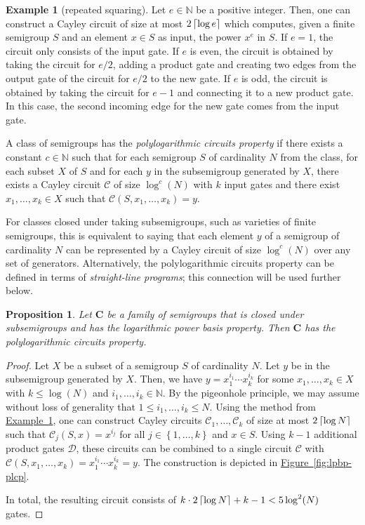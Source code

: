 \documentclass[11pt]{article}
\numberwithin{equation}{section}
\newtheorem{proposition}[theorem]{Proposition}
\theoremstyle{definition}
\newtheorem{example}[theorem]{Example}
\theoremstyle{plain}
\newcommand{\C}{\mathbb C}
\newcommand{\N}{\mathbb N}
\newcommand{\expref}[2]{\hyperref[#2]{#1~\ref{#2}}}
\renewcommand{\leq}{\leqslant}
\renewcommand{\le}{\leq}
\newcommand{\ceil}[1]{\ensuremath\left\lceil#1\right\rceil}
\newcommand{\os}[1]{\ensuremath{\left\{#1\right\}}}
\newcommand{\vC}{\mathbf{C}}
\renewcommand{\C}{\ensuremath{\mathcal{C}}}
\newcommand{\SLPBP}{logarithmic power basis property}
\newcommand{\SPLCP}{polylogarithmic circuits property}
\begin{document}
%
%
\begin{example}[repeated squaring]   %
  Let $e \in \N$ be a positive integer.
  Then, one can construct a Cayley circuit of size at most $2\ceil{\log e}$
  which computes, given a finite semigroup $S$ and an element $x \in S$ as
  input, the power $x^e$ in $S$.
  If $e = 1$, the circuit only consists of the input gate.
  If $e$ is even, the circuit is obtained by taking the circuit for $e/2$,
  adding a product gate and creating two edges from the output gate of the
  circuit for $e/2$ to the new gate.
  If $e$ is odd, the circuit is obtained by taking the circuit for $e-1$ and
  connecting it to a new product gate. In this case, the second incoming edge
  for the new gate comes from the input gate.
  \label{ex:power}
\end{example}

%
A class of semigroups has the \emph{\SPLCP} if there exists a constant $c \in
\N$ such that for each semigroup $S$ of cardinality $N$ from the class, for
each subset $X$ of $S$ and for each $y$ in the subsemigroup generated by $X$,
there exists a Cayley circuit $\C$ of size $\log^c(N)$ with $k$ input gates and
there exist $x_1, \dots, x_k \in X$ such that $\C(S, x_1, \dots, x_k) = y$.

For classes closed under taking subsemigroups, such as varieties of finite
semigroups, this is equivalent to saying that each element $y$ of a semigroup
of cardinality $N$ can be represented by a Cayley circuit of size $\log^c(N)$
over any set of generators.
%
Alternatively, the {\SPLCP} can be defined in terms of \emph{straight-line
programs}; this connection will be used further below.

\begin{proposition}
  Let $\vC$ be a family of semigroups that is closed under subsemigroups and
  has the {\SLPBP}. Then $\vC$ has the {\SPLCP}.
  \label{prop:lpbp-plcp}
\end{proposition}
%
\begin{proof}
  Let $X$ be a subset of a semigroup $S$ of cardinality $N$. Let $y$ be in the
  subsemigroup generated by $X$.
  Then, we have $y = x_1^{i_1} \cdots x_k^{i_k}$ for some $x_1, \dots, x_k \in
  X$  with $k \le \log(N)$ and $i_1, \dots, i_k \in \N$.
  By the pigeonhole principle, we may assume without loss of generality that
  $1 \le i_1, \dots, i_k \le N$.
  Using the method from \expref{Example}{ex:power}, one can construct Cayley
  circuits $\C_1, \dots, \C_k$ of size at most $2\ceil{\log N}$ such that
  $\C_j(S, x) = x^{i_j}$ for all $j \in \os{1, \dots, k}$ and $x \in S$. Using
  $k-1$ additional product gates $\mathcal{D}$, these circuits can be combined
  to a single circuit $\C$ with $\C(S, x_1, \dots, x_k) = x_1^{i_1} \cdots
  x_k^{i_k} = y$.
  The construction is depicted in \expref{Figure}{fig:lpbp-plcp}.

  In total, the resulting circuit consists of $k \cdot 2\ceil{\log N} + k - 1 <
  5 \log^2(N)$ gates.
\end{proof}
\end{document}
